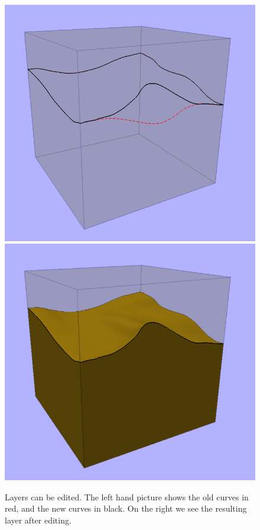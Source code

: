 \documentclass[a4paper,12pt]{report}
\begin{document}
\begin{figure}
\includegraphics[width=.5\linewidth]{thesis/results/simpleLayerEdit.png}
\includegraphics[width=.5\linewidth]{thesis/results/simpleLayerEdited.png}
 \caption{Layers can be edited. The left hand picture shows the old curves in red, and the new curves in black. On the right we see the resulting layer after editing.}
 \label{fig:layerEdit}
\end{figure}
\end{document}
